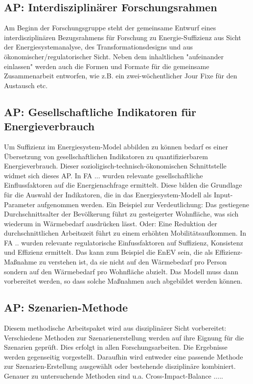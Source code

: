 \documentclass[a4paper,11pt,twoside]{scrartcl}
\begin{document}
\subsection*{AP: Interdisziplinärer Forschungsrahmen}
Am Beginn der Forschungsgruppe steht der gemeinsame Entwurf eines interdisziplinären Bezugsrahmens für Forschung zu Energie-Suffizienz aus Sicht der Energiesystemanalyse, des Transformationsdesigns und aus ökonomischer/regulatorischer Sicht. Neben dem inhaltlichen "aufeinander einlassen" werden auch die Formen und Formate für die gemeinsame Zusammenarbeit entworfen, wie z.B. ein zwei-wöchentlicher Jour Fixe für den Austausch etc.

\subsection*{AP: Gesellschaftliche Indikatoren für Energieverbrauch}
Um Suffizienz im Energiesystem-Model abbilden zu können bedarf es einer Übersetzung von gesellschaftlichen Indikatoren zu quantifizierbarem Energieverbrauch. Dieser sozioligisch-technisch-ökonomischen Schnittstelle widmet sich dieses AP. In FA ... wurden relevante gesellschaftliche Einflussfaktoren auf die Energienachfrage ermittelt. Diese bilden die Grundlage für die Auswahl der Indikatoren, die in das Energiesystem-Modell als Input-Parameter aufgenommen werden. Ein Beispiel zur Verdeutlichung: Das gestiegene Durchschnittsalter der Bevölkerung führt zu gesteigerter Wohnfläche, was sich wiederum in Wärmebedarf ausdrücken lässt. Oder: Eine Reduktion der durchschnittlichen Arbeitszeit führt zu einem erhöhten Mobilitätsaufkommen. In FA .. wurden relevante regulatorische Einfussfaktoren auf Suffizienz, Konsistenz und Effizienz ermittelt. Das kann zum Beispiel die EnEV sein, die als Effizienz-Maßnahme zu verstehen ist, da sie nicht auf den Wärmebedarf pro Person sondern auf den Wärmebedarf pro Wohnfläche abzielt. Das Modell muss dann vorbereitet werden, so dass solche Maßnahmen auch abgebildet werden können.

\subsection*{AP: Szenarien-Methode}
Diesem methodische Arbeitspaket wird aus disziplinärer Sicht vorbereitet: Verschiedene Methoden zur Szenarienerstellung werden auf ihre Eignung für die Szenarien geprüft. Dies erfolgt in allen Forschungsarbeiten. Die Ergebnisse werden gegenseitig vorgestellt. Daraufhin wird entweder eine passende Methode zur Szenarien-Erstellung ausgewählt oder bestehende disziplinäre kombiniert. Genauer zu untersuchende Methoden sind u.a. Cross-Impact-Balance .....
\end{document}
